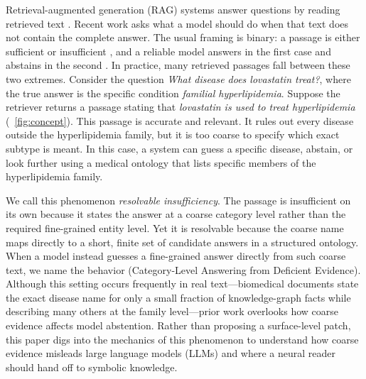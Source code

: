 Retrieval-augmented generation (RAG) systems answer questions by reading retrieved text \citep{lewis2020rag}. Recent work asks what a model should do when that text does not contain the complete answer. The usual framing is binary: a passage is either sufficient or insufficient \citep{joren2025sufficient}, and a reliable model answers in the first case and abstains in the second \citep{wen2025abstention}. In practice, many retrieved passages fall between these two extremes. Consider the question \emph{What disease does lovastatin treat?}, where the true answer is the specific condition \emph{familial hyperlipidemia}. Suppose the retriever returns a passage stating that \emph{lovastatin is used to treat hyperlipidemia} (~\cref{fig:concept}). This passage is accurate and relevant. It rules out every disease outside the hyperlipidemia family, but it is too coarse to specify which exact subtype is meant. In this case, a system can guess a specific disease, abstain, or look further using a medical ontology that lists specific members of the hyperlipidemia family.

We call this phenomenon \emph{resolvable insufficiency}. The passage is insufficient on its own because it states the answer at a coarse category level rather than the required fine-grained entity level. Yet it is resolvable because the coarse name maps directly to a short, finite set of candidate answers in a structured ontology. When a model instead guesses a fine-grained answer directly from such coarse text, we name the behavior \clade{} (Category-Level Answering from Deficient Evidence). Although this setting occurs frequently in real text---biomedical documents state the exact disease name for only a small fraction of knowledge-graph facts while describing many others at the family level—prior work overlooks how coarse evidence affects model abstention. Rather than proposing a surface-level patch, this paper digs into the mechanics of this phenomenon to understand how coarse evidence misleads large language models (LLMs) and where a neural reader should hand off to symbolic knowledge.

